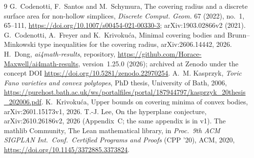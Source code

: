 \documentclass[11pt]{article}
\theoremstyle{definition}
\theoremstyle{remark}
\newcommand{\repoversion}{1.25.0}
\begin{document}
{\small
\begin{thebibliography}{9}
\setlength{\itemsep}{1pt}
 G.~Codenotti, F.~Santos and M.~Schymura, The covering radius and
a discrete surface area for non-hollow simplices, \emph{Discrete Comput.
Geom.} 67 (2022), no.~1, 65--111,
\url{https://doi.org/10.1007/s00454-021-00330-3}; arXiv:1903.02866v2 (2021).
 G.~Codenotti, A.~Freyer and K.~Krivokuća, Minimal covering
bodies and Brunn--Minkowski type inequalities for the covering radius,
arXiv:2606.14442, 2026.
 H.~Dong, \emph{ai4math-results}, repository,
\url{https://github.com/Horace-Maxwell/ai4math-results}, version~\repoversion{}
(2026); archived at Zenodo under the concept DOI
\url{https://doi.org/10.5281/zenodo.22970254}.
 A.~M. Kasprzyk, \emph{Toric Fano varieties and convex
polytopes}, PhD thesis, University of Bath, 2006,
\url{https://purehost.bath.ac.uk/ws/portalfiles/portal/187944797/kasprzyk_20thesis_202006.pdf}.
 K.~Krivokuća, Upper bounds on covering minima of convex bodies,
arXiv:2601.15173v1, 2026.
 T.-J. Lee, On the hyperplane conjecture, arXiv:2610.26186v2,
2026 (Appendix~C; the same appendix is in v1).
The mathlib Community, The Lean mathematical library, in \emph{Proc.\ 9th ACM
SIGPLAN Int.\ Conf.\ Certified Programs and Proofs} (CPP '20), ACM, 2020,
\url{https://doi.org/10.1145/3372885.3373824}.
\end{thebibliography}}
\end{document}
